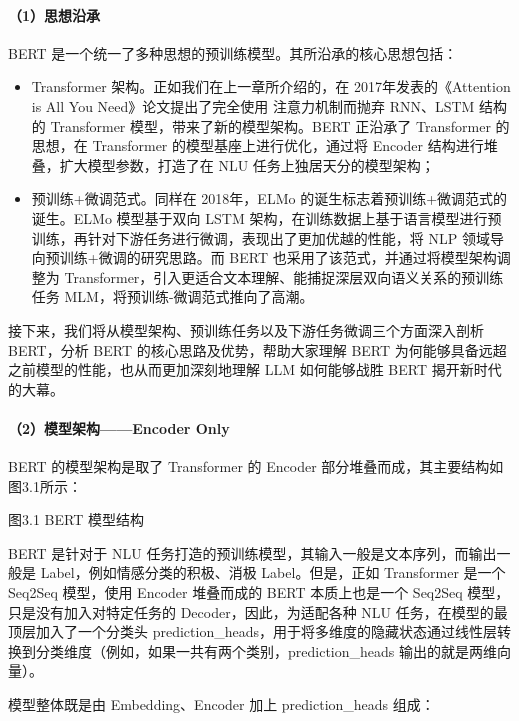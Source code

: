 \documentclass[12pt,a4paper]{book}
\begin{document}
\paragraph{（1）思想沿承}\label{ux601dux60f3ux6cbfux627f}

BERT 是一个统一了多种思想的预训练模型。其所沿承的核心思想包括：

\begin{itemize}
\tightlist
\item
  Transformer 架构。正如我们在上一章所介绍的，在 2017年发表的《Attention
  is All You Need》论文提出了完全使用 注意力机制而抛弃 RNN、LSTM 结构的
  Transformer 模型，带来了新的模型架构。BERT 正沿承了 Transformer
  的思想，在 Transformer 的模型基座上进行优化，通过将 Encoder
  结构进行堆叠，扩大模型参数，打造了在 NLU 任务上独居天分的模型架构；
\item
  预训练+微调范式。同样在 2018年，ELMo
  的诞生标志着预训练+微调范式的诞生。ELMo 模型基于双向 LSTM
  架构，在训练数据上基于语言模型进行预训练，再针对下游任务进行微调，表现出了更加优越的性能，将
  NLP 领域导向预训练+微调的研究思路。而 BERT
  也采用了该范式，并通过将模型架构调整为
  Transformer，引入更适合文本理解、能捕捉深层双向语义关系的预训练任务
  MLM，将预训练-微调范式推向了高潮。
\end{itemize}

接下来，我们将从模型架构、预训练任务以及下游任务微调三个方面深入剖析
BERT，分析 BERT 的核心思路及优势，帮助大家理解 BERT
为何能够具备远超之前模型的性能，也从而更加深刻地理解 LLM 如何能够战胜
BERT 揭开新时代的大幕。

\paragraph{（2）模型架构------Encoder
Only}\label{ux6a21ux578bux67b6ux6784encoder-only}

BERT 的模型架构是取了 Transformer 的 Encoder
部分堆叠而成，其主要结构如图3.1所示：

图3.1 BERT 模型结构

BERT 是针对于 NLU
任务打造的预训练模型，其输入一般是文本序列，而输出一般是
Label，例如情感分类的积极、消极 Label。但是，正如 Transformer 是一个
Seq2Seq 模型，使用 Encoder 堆叠而成的 BERT 本质上也是一个 Seq2Seq
模型，只是没有加入对特定任务的 Decoder，因此，为适配各种 NLU
任务，在模型的最顶层加入了一个分类头
prediction\_heads，用于将多维度的隐藏状态通过线性层转换到分类维度（例如，如果一共有两个类别，prediction\_heads
输出的就是两维向量）。

模型整体既是由 Embedding、Encoder 加上 prediction\_heads 组成：
\end{document}

